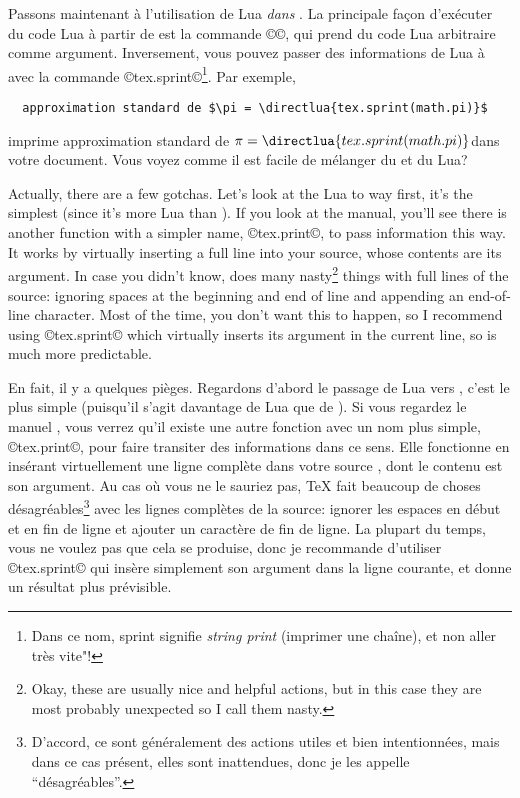 \documentclass{lltxdoc}
\begin{document}
\medskip

Passons maintenant à l'utilisation de Lua \emph{dans} \luatex. La principale
façon d'exécuter du code Lua à partir de \tex est la commande ©\directlua©,
qui prend du code Lua arbitraire comme argument. Inversement, vous pouvez
passer des informations de Lua à \tex avec la commande ©tex.sprint©\footnote{Dans
  ce nom, \og{}sprint\gf{} signifie \og{}\emph{string print}\fg{}
  (\og{}imprimer une chaîne\fg{}), et non \og{}aller très vite"\fg{}!}.
Par exemple,
\begin{Verbatim}
  approximation standard de $\pi = \directlua{tex.sprint(math.pi)}$
\end{Verbatim}
imprime \og{}approximation standard de $\pi = \directlua{tex.sprint(math.pi)}$\fg dans votre document. Vous voyez comme il est facile de mélanger du \tex et du Lua?

Actually, there are a few gotchas. Let's look at the Lua to \tex way first,
it's the simplest (since it's more Lua than \tex). If you look at the \luatex
manual, you'll see there is another function with a simpler name, ©tex.print©,
to pass information this way. It works by virtually inserting a full line into
your \tex source, whose contents are its argument. In case you didn't know,
\tex does many nasty\footnote{Okay, these are usually nice and helpful
  actions, but in this case they are most probably unexpected so I call them
  nasty.} things with full lines of the source:
ignoring spaces at the beginning and end of line and appending an end-of-line
character. Most of the time, you don't want this to happen, so I recommend
using ©tex.sprint© which virtually inserts its argument in the current line,
so is much more predictable.

En fait, il y a quelques pièges. Regardons d'abord le passage de Lua vers \tex,
c'est le plus simple (puisqu'il s'agit davantage de Lua que de \tex).
Si vous regardez le manuel \luatex, vous verrez qu'il existe une autre fonction
avec un nom plus simple, ©tex.print©, pour faire transiter des informations
dans ce sens. Elle fonctionne en insérant virtuellement une ligne complète
dans votre source \tex, dont le contenu est son argument. Au cas où vous ne le sauriez pas, TeX fait beaucoup de choses désagréables\footnote{D'accord, ce sont généralement des actions utiles et bien intentionnées, mais dans ce cas présent, elles sont inattendues, donc je les appelle ``désagréables''.} avec les lignes complètes de la source: ignorer les espaces en début et en fin de ligne et ajouter un caractère de fin de ligne. La plupart du temps, vous ne voulez pas que cela se produise, donc je recommande d'utiliser ©tex.sprint© qui insère simplement son argument dans la ligne courante, et donne un résultat plus prévisible.
\end{document}

